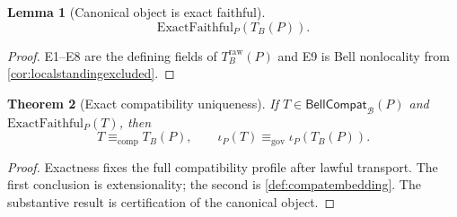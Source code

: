 \documentclass[11pt]{article}
\newtheorem{theorem}{Theorem}[section]
\newtheorem{lemma}[theorem]{Lemma}
\theoremstyle{definition}
\newcommand{\Bell}{\mathcal{B}}
\newcommand{\GovEq}{\equiv_{\mathrm{gov}}}
\newcommand{\CompEq}{\equiv_{\mathrm{comp}}}
\newcommand{\BellCompat}{\mathsf{BellCompat}_{\Bell}(P)}
\newcommand{\ExactFaithful}{\mathrm{ExactFaithful}_{P}}
\newcommand{\RawTB}{T^{\mathrm{raw}}_{B}(P)}
\begin{document}
\begin{lemma}[Canonical object is exact faithful]\label{lem:canonicalexactfaithful}
\[
\ExactFaithful(T_B(P)).
\]
\end{lemma}
\begin{proof}
E1--E8 are the defining fields of $\RawTB$ and E9 is Bell nonlocality from \cref{cor:localstandingexcluded}.
\end{proof}

\begin{theorem}[Exact compatibility uniqueness]\label{thm:compatibilityuniqueness}
If $T\in\BellCompat$ and $\ExactFaithful(T)$, then
\[
T\CompEq T_B(P),
\qquad
\iota_P(T)\GovEq\iota_P(T_B(P)).
\]
\end{theorem}
\begin{proof}
Exactness fixes the full compatibility profile after lawful transport. The first conclusion is extensionality; the second is \cref{def:compatembedding}. The substantive result is certification of the canonical object.
\end{proof}
\end{document}
